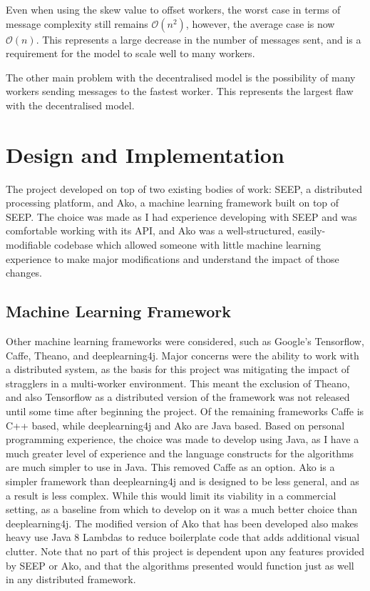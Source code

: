 \documentclass[12pt]{article}
\begin{document}
Even when using the skew value to offset workers, the worst case in terms of message complexity still remains $\mathcal{O}(n^2)$, however, the average case is now $\mathcal{O}(n)$. This represents a large decrease in the number of messages sent, and is a requirement for the model to scale well to many workers.

The other main problem with the decentralised model is the possibility of many workers sending  messages to the fastest worker. This represents the largest flaw with the decentralised model.

\newpage

\section{Design and Implementation}

The project developed on top of two existing bodies of work: SEEP, a distributed processing platform, and Ako, a machine learning framework built on top of SEEP. The choice was made as I had experience developing with SEEP and was comfortable working with its API, and Ako was a well-structured, easily-modifiable codebase which allowed someone with little machine learning experience to make major modifications and understand the impact of those changes.

\subsection{Machine Learning Framework}

Other machine learning frameworks were considered, such as Google's Tensorflow, Caffe, Theano, and deeplearning4j. Major concerns were the ability to work with a distributed system, as the basis for this project was mitigating the impact of stragglers in a multi-worker environment. This meant the exclusion of Theano, and also Tensorflow as a distributed version of the framework was not released until some time after beginning the project. Of the remaining frameworks Caffe is C++ based, while deeplearning4j and Ako are Java based. Based on personal programming experience, the choice was made to develop using Java, as I have a much greater level of experience and the language constructs for the algorithms are much simpler to use in Java. This removed Caffe as an option. Ako is a simpler framework than deeplearning4j and is designed to be less general, and as a result is less complex. While this would limit its viability in a commercial setting, as a baseline from which to develop on it was a much better choice than deeplearning4j. The modified version of Ako that has been developed also makes heavy use Java 8 Lambdas to reduce boilerplate code that adds additional visual clutter.
\newline
\newline
Note that no part of this project is dependent upon any features provided by SEEP or Ako, and that the algorithms presented would function just as well in any distributed framework.
\end{document}

